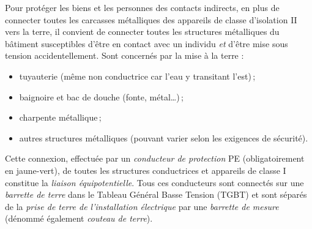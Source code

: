 Pour protéger les biens et les personnes des contacts indirects, en plus de connecter toutes les carcasses métalliques des appareils de classe d'isolation II vers la terre, il convient de connecter toutes les structures métalliques du bâtiment susceptibles d'être en contact avec un individu \emph{et} d'être mise sous tension accidentellement. Sont concernés par la mise à la terre  :
\begin{itemize}
\item tuyauterie (même non conductrice car l'eau y transitant l'est)\,;
\item baignoire et bac de douche (fonte, métal\ldots)\,;
\item charpente métallique\,;
\item autres structures métalliques (pouvant varier selon les exigences de sécurité).
\end{itemize}
Cette connexion, effectuée par un \emph{conducteur de protection} PE  (obligatoirement en jaune-vert), de toutes les structures conductrices et appareils de classe I constitue la \emph{liaison équipotentielle}. Tous ces conducteurs sont connectés sur une \emph{barrette de terre}  dans le Tableau Général Basse Tension (TGBT) et sont séparés de la \emph{prise de terre de l'installation électrique}  par une \emph{barrette de mesure}  (dénommé également \emph{couteau de terre}).\\

